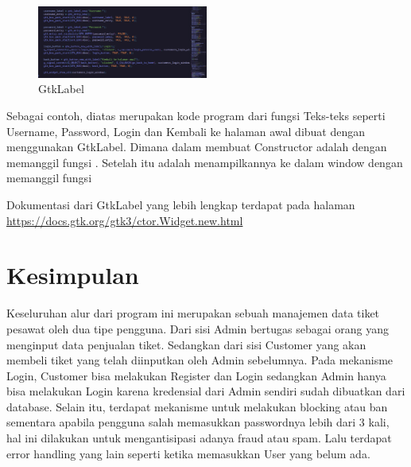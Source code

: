\documentclass[a4paper,12pt]{article}
\begin{document}
\begin{figure}[!htbp]
    \centering
    \includegraphics[width=0.5\textwidth]{./docs_label.png}
    \caption{GtkLabel}

\end{figure}
\FloatBarrier 

Sebagai contoh, diatas merupakan kode program dari fungsi \texttt{}
Teks-teks seperti Username, Password, Login dan Kembali ke halaman awal dibuat dengan menggunakan GtkLabel. Dimana dalam membuat Constructor adalah dengan memanggil fungsi
\texttt{}. Setelah itu adalah menampilkannya ke dalam window dengan memanggil fungsi \texttt{}

Dokumentasi dari GtkLabel yang lebih lengkap terdapat pada halaman \url{https://docs.gtk.org/gtk3/ctor.Widget.new.html}

\section{Kesimpulan}
Keseluruhan alur dari program ini merupakan sebuah manajemen data tiket pesawat oleh dua tipe pengguna.
Dari sisi Admin bertugas sebagai orang yang menginput data penjualan tiket. Sedangkan dari sisi Customer yang akan membeli tiket yang telah diinputkan oleh Admin sebelumnya.
Pada mekanisme Login, Customer bisa melakukan Register dan Login sedangkan Admin hanya bisa melakukan Login karena kredensial dari Admin sendiri sudah dibuatkan dari database. Selain itu, terdapat mekanisme untuk melakukan blocking atau ban
sementara apabila pengguna salah memasukkan passwordnya lebih dari 3 kali, hal ini dilakukan untuk mengantisipasi adanya fraud atau spam. Lalu terdapat error handling yang lain seperti ketika memasukkan User yang belum ada.
\end{document}
